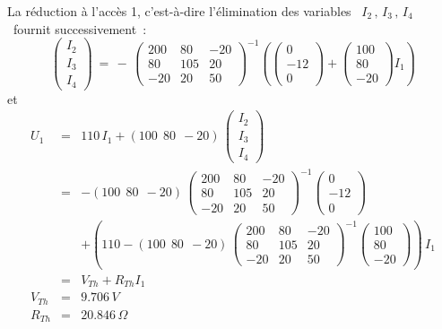 La réduction à l'accès 1, c'est-à-dire l'élimination des variables \
$I_2\, ,\, I_3\, ,\, I_4$ \ fournit successivement~:
\[ \left(  \begin{array}{c} I_2 \\ I_3 \\ I_4 \end{array} \right)
\: = \, - \, 
\left( \begin{array}{rrr} 
200 & 80 & -20 \\
80 & 105 & 20\\
-20 & 20 & 50
\end{array} \right)^{-1}
\left( \left( \begin{array}{c} 0 \\ -12 \\ 0 \end{array} \right)
+ \left( \begin{array}{r} 100 \\ 80 \\ -20 \end{array} \right)
I_1 \right) \]
et
\begin{eqnarray*}
	U_1 &=&  110\, I_1 + \left( 100~~80~~-20 \right) \, 
	\left( \begin{array}{c} I_2 \\ I_3 \\ I_4 \end{array} \right)\\
	&=& -\left( 100~~80~~-20 \right) \, 
	\left( \begin{array}{rrr} 
		200 & 80 & -20\\
		80 & 105 & 20\\
		-20 & 20 & 50 
	\end{array} \right)^{-1}
	\left( \begin{array}{c} 0 \\ -12 \\ 0 \end{array} \right)\\
	&& + \left( 110 - \left( 100~~80~~-20 \right) \, 
	\left( \begin{array}{rrr}
		200 & 80 & -20\\
		80 & 105 & 20\\
		-20 & 20 & 50
	\end{array} \right) ^{-1}
	\left( \begin{array}{r} 100\\ 80\\ -20 \end{array} \right) 
	\right) \, I_1\\
	&=& V_{Th} + R_{Th} I_1\\
	V_{Th} &=& 9.706\, V\\
	R_{Th} &=& 20.846\, \Omega
\end{eqnarray*}

